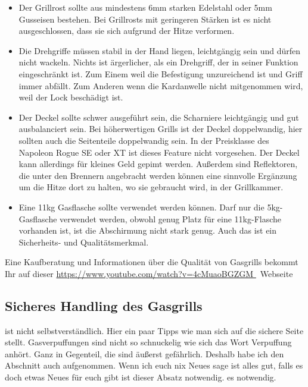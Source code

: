 	\begin{itemize}[noitemsep]
		\item Der Grillrost sollte aus mindestens 6mm starken Edelstahl oder 
	    5mm Gusseisen bestehen. Bei Grillrosts mit 
		geringeren Stärken
		ist es nicht ausgeschlossen, dass sie sich aufgrund der Hitze verformen.
		\item Die Drehgriffe müssen stabil in der Hand liegen, leichtgängig sein und 
		dürfen nicht wackeln. Nichts ist ärgerlicher, als ein Drehgriff, der 
		in seiner Funktion eingeschränkt ist.
		Zum Einem weil die Befestigung unzureichend ist und Griff immer abfällt. 
		Zum Anderen wenn die Kardanwelle nicht mitgenommen wird, weil 
		der Lock beschädigt ist.
		\item Der Deckel sollte schwer ausgeführt sein, die Scharniere leichtgängig 
		und gut ausbalanciert sein. Bei höherwertigen Grills ist der 
		Deckel doppelwandig, hier sollten auch die
		Seitenteile doppelwandig sein. In der Preisklasse des Napoleon Rogue SE 
		oder XT ist dieses Feature nicht vorgesehen. Der Deckel kann 
		allerdings für kleines Geld gepimt werden. Außerdem sind Reflektoren, die 
		unter den Brennern angebracht werden können eine sinnvolle Ergänzung 
		um die Hitze dort zu halten, wo sie gebraucht wird, in der Grillkammer.
		\item Eine 11kg Gasflasche sollte verwendet werden können. Darf nur die 
		5kg-Gasflasche verwendet werden, obwohl genug Platz für eine 
		11kg-Flasche vorhanden ist,
		ist die Abschirmung nicht stark genug. Auch das ist ein Sicherheits- und 
		Qualitätsmerkmal.
	\end{itemize}

	Eine Kaufberatung und Informationen über die Qualität von Gasgrills bekommt 
	Ihr auf dieser 
	\url{https://www.youtube.com/watch?v=4cMuaoBGZGM }\ {Webseite}

\subsection{Sicheres Handling des Gasgrills} 

	ist nicht selbstverständlich. 
	Hier ein paar Tipps wie man sich auf die 
	sichere Seite stellt. 
	Gasverpuffungen sind nicht so schnuckelig wie sich das Wort Verpuffung 
	anhört. Ganz in Gegenteil, die sind äußerst 
	gefährlich. Deshalb habe ich 
	den Abschnitt auch aufgenommen. Wenn ich euch nix Neues sage ist alles gut, 
	falls es doch etwas Neues für euch gibt ist dieser Absatz notwendig. 
	es notwendig.

